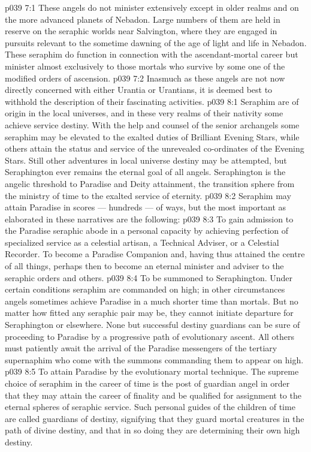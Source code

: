 \vs p039 7:1 These angels do not minister extensively except in older realms and on the more advanced planets of Nebadon. Large numbers of them are held in reserve on the seraphic worlds near Salvington, where they are engaged in pursuits relevant to the sometime dawning of the age of light and life in Nebadon. These seraphim do function in connection with the ascendant\hyp{}mortal career but minister almost exclusively to those mortals who survive by some one of the modified orders of ascension.
\vs p039 7:2 Inasmuch as these angels are not now directly concerned with either Urantia or Urantians, it is deemed best to withhold the description of their fascinating activities.
\vs p039 8:1 Seraphim are of origin in the local universes, and in these very realms of their nativity some achieve service destiny. With the help and counsel of the senior archangels some seraphim may be elevated to the exalted duties of Brilliant Evening Stars, while others attain the status and service of the unrevealed co\hyp{}ordinates of the Evening Stars. Still other adventures in local universe destiny may be attempted, but Seraphington ever remains the eternal goal of all angels. Seraphington is the angelic threshold to Paradise and Deity attainment, the transition sphere from the ministry of time to the exalted service of eternity.
\vs p039 8:2 \pc Seraphim may attain Paradise in scores --- hundreds --- of ways, but the most important as elaborated in these narratives are the following:
\vs p039 8:3 \bibnobreakspace To gain admission to the Paradise seraphic abode in a personal capacity by achieving perfection of specialized service as a celestial artisan, a Technical Adviser, or a Celestial Recorder. To become a Paradise Companion and, having thus attained the centre of all things, perhaps then to become an eternal minister and adviser to the seraphic orders and others.
\vs p039 8:4 \bibnobreakspace To be summoned to Seraphington. Under certain conditions seraphim are commanded on high; in other circumstances angels sometimes achieve Paradise in a much shorter time than mortals. But no matter how fitted any seraphic pair may be, they cannot initiate departure for Seraphington or elsewhere. None but successful destiny guardians can be sure of proceeding to Paradise by a progressive path of evolutionary ascent. All others must patiently await the arrival of the Paradise messengers of the tertiary supernaphim who come with the summons commanding them to appear on high.
\vs p039 8:5 \bibnobreakspace To attain Paradise by the evolutionary mortal technique. The supreme choice of seraphim in the career of time is the post of guardian angel in order that they may attain the career of finality and be qualified for assignment to the eternal spheres of seraphic service. Such personal guides of the children of time are called guardians of destiny, signifying that they guard mortal creatures in the path of divine destiny, and that in so doing they are determining their own high destiny.
